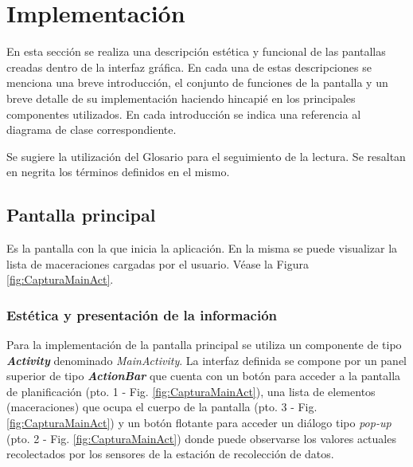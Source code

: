 \section{Implementación}
    \par En esta sección se realiza una descripción estética y funcional de las pantallas creadas dentro de la interfaz gráfica. En cada una de estas descripciones se menciona una breve introducción, el conjunto de funciones de la pantalla y un breve detalle de su implementación haciendo hincapié en los principales componentes utilizados. En cada introducción se indica una referencia al diagrama de clase correspondiente. 
    
    \par Se sugiere la utilización del Glosario para el seguimiento de la lectura. Se resaltan en negrita los términos definidos en el mismo.
     
    \subsection{Pantalla principal}
        \label{DescripPantallaPrincipal}
            \par Es la pantalla con la que inicia la aplicación. En la misma se puede visualizar la lista de maceraciones cargadas por el usuario. Véase la Figura \ref{fig:CapturaMainAct}. 
            
        \subsubsection{Estética y presentación de la información}
                \par Para la implementación de la pantalla principal se utiliza un componente de tipo \textbf{\textit{\gls{Activity}}} denominado \textit{MainActivity}. La interfaz definida se compone por un panel superior de tipo \textbf{\textit{\gls{ActionBar}}} que cuenta con un botón para acceder a la pantalla de planificación (pto. 1 - Fig. \ref{fig:CapturaMainAct}), una lista de elementos (maceraciones) que ocupa el cuerpo de la pantalla (pto. 3 - Fig. \ref{fig:CapturaMainAct}) y un botón flotante para acceder un diálogo tipo \textit{pop-up} (pto. 2 - Fig. \ref{fig:CapturaMainAct}) donde puede observarse los valores actuales recolectados por los sensores de la estación de recolección de datos.%
                
